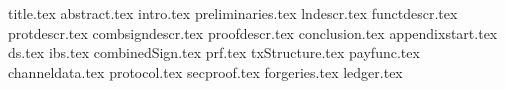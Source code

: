 \documentclass{llncs}
\begin{document}
\pagestyle{plain}
{title.tex}
{abstract.tex}
{intro.tex}
{preliminaries.tex}
{lndescr.tex}
{functdescr.tex}
{protdescr.tex}
{combsigndescr.tex}
{proofdescr.tex}
{conclusion.tex}
{appendixstart.tex}
{ds.tex}
{ibs.tex}
{combinedSign.tex}
{prf.tex}
{txStructure.tex}
{payfunc.tex}
{channeldata.tex}
{protocol.tex}
{secproof.tex}
{forgeries.tex}
{ledger.tex}


\end{document}
